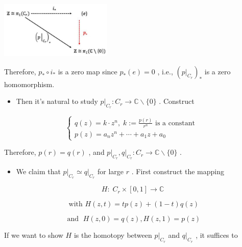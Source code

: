 \begin{center}
\includegraphics[max width=0.4\textwidth]{images/bo_d2bcsrref24c73avs720_140_722_1373_516_261_0.jpg}
\end{center}
\hspace*{3em} 

Therefore, \({p}_{ * } \circ  {i}_{ * }\) is a zero map since \({p}_{ * }\left( e\right)  = 0\) , i.e., \({\left( {\left. p\right| }_{{C}_{r}}\right) }_{ * }\) is a zero homomorphism.

\begin{itemize}
\item Then it’s natural to study \({\left. p\right| }_{{C}_{r}} : {C}_{r} \rightarrow  \mathbb{C} \smallsetminus  \{ 0\}\) . Construct
\end{itemize}

\[
\left\{  \begin{array}{l} q\left( z\right)  = k \cdot  {z}^{n},\;k \mathrel{\text{ := }} \frac{p\left( r\right) }{{r}^{n}}\text{ is a constant } \\  p\left( z\right)  = {a}_{n}{z}^{n} + \cdots  + {a}_{1}z + {a}_{0} \end{array}\right.
\]

Therefore, \(p\left( r\right)  = q\left( r\right)\) , and \({\left. p\right| }_{{C}_{r}},{\left. q\right| }_{{C}_{r}} : {C}_{r} \rightarrow  \mathbb{C} \smallsetminus  \{ 0\}\) .

\begin{itemize}
\item We claim that \({\left. p\right| }_{{C}_{r}} \simeq  {\left. q\right| }_{{C}_{r}}\) for large \(r\) . First construct the mapping
\end{itemize}

\[
H : \;{C}_{r} \times  \left\lbrack  {0,1}\right\rbrack   \rightarrow  \mathbb{C}
\]

\[
\text{ with }H\left( {z,t}\right)  = {tp}\left( z\right)  + \left( {1 - t}\right) q\left( z\right)
\]

\[
\text{ and }\;H\left( {z,0}\right)  = q\left( z\right) ,H\left( {z,1}\right)  = p\left( z\right)
\]

If we want to show \(H\) is the homotopy between \({\left. p\right| }_{{C}_{r}}\) and \({\left. q\right| }_{{C}_{r}}\) , it suffices to

